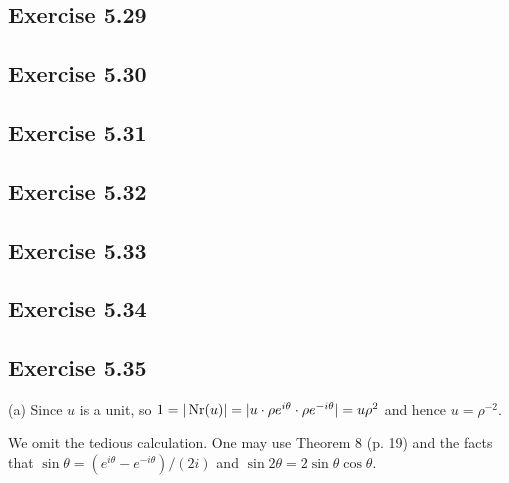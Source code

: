 \documentclass[../Marcus.tex]{subfiles}
\begin{document}
\subsection*{Exercise 5.29}

\begin{comment}
(a) By induction, it's sufficient to consider the ideal $I=(\alpha,\beta)$ in $\AA$ which is generated by two elements $\alpha,\beta \in \AA$. Take a field $K/\QQ$ s.t. $\alpha,\beta \in \AA\cap K=:R$ and consider the ideal $I':=(\alpha,\beta)$ in $R$ generated by $\alpha,\beta$. By Exercise 5.28 (b), choose $L/K$ finite s.t. $I'$ becomes principal in $S:=\AA \cap L$, i.e., $I'S = \gamma S$ for some $\gamma \in S$. This implies $I = I'S \AA = \gamma S \AA = \gamma \AA$ is principal in $\AA$.
\end{comment}

\subsection*{Exercise 5.30}

\subsection*{Exercise 5.31}

\subsection*{Exercise 5.32}

\subsection*{Exercise 5.33}

\subsection*{Exercise 5.34}

\subsection*{Exercise 5.35}

(a) Since $u$ is a unit, so $1 = |\operatorname{Nr}(u)| = |u \cdot \rho e^{i\theta} \cdot \rho e^{-i\theta}| = u\rho^2$ and hence $u=\rho^{-2}$.

We omit the tedious calculation. One may use Theorem 8 (p. 19) and the facts that $\sin\theta = (e^{i\theta}-e^{-i\theta})/(2i)$ and $\sin2\theta = 2\sin\theta\cos\theta$.
\end{document}
